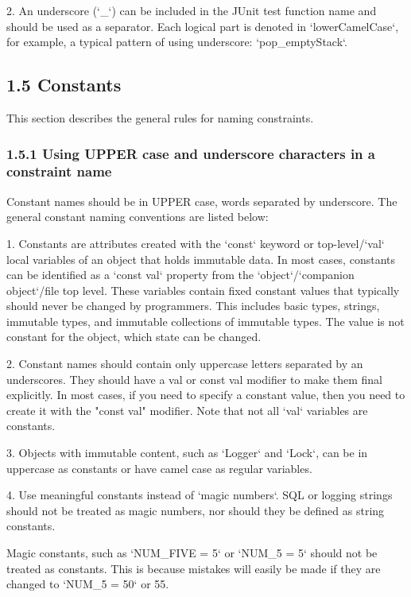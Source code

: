2.	An underscore (`_`) can be included in the JUnit test function name and should be used as a separator. Each logical part is denoted in `lowerCamelCase`, for example, a typical pattern of using underscore: `pop_emptyStack`.

\subsection*{\textbf{1.5 Constants}}

This section describes the general rules for naming constraints.

\subsubsection*{\textbf{1.5.1 Using UPPER case and underscore characters in a constraint name}}
\leavevmode\newline

Constant names should be in UPPER case, words separated by underscore. The general constant naming conventions are listed below:

1. Constants are attributes created with the `const` keyword or top-level/`val` local variables of an object that holds immutable data. In most cases, constants can be identified as a `const val` property from the `object`/`companion object`/file top level. These variables contain fixed constant values that typically should never be changed by programmers. This includes basic types, strings, immutable types, and immutable collections of immutable types. The value is not constant for the object, which state can be changed.

2. Constant names should contain only uppercase letters separated by an underscores. They should have a val or const val modifier to make them final explicitly. In most cases, if you need to specify a constant value, then you need to create it with the "const val" modifier. Note that not all `val` variables are constants.

3. Objects with immutable content, such as `Logger` and `Lock`, can be in uppercase as constants or have camel case as regular variables.

4. Use meaningful constants instead of `magic numbers`. SQL or logging strings should not be treated as magic numbers, nor should they be defined as string constants.

Magic constants, such as `NUM_FIVE = 5` or `NUM_5 = 5` should not be treated as constants. This is because mistakes will easily be made if they are changed to `NUM_5 = 50` or 55.

